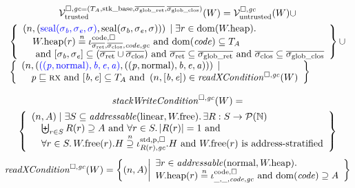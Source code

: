\documentclass[acmsmall,review,anonymous]{acmart}\settopmatter{printfolios=true,printccs=false,printacmref=false}
\renewcommand{\perm}{\var{p}}
\begin{document}
\begin{multline*}
  \lrvtrusted[\square,\gc=(\ta,\stkb,\gsigrets,\gsigcloss)](W) = \lrv(W)\cup \\
  \begin{array}[t]{l}
    \left\{ \begin{array}{l} \npair{\left(\src{\seal{\sigma_\baddr,\sigma_\eaddr,\sigma}}, \seal{\sigma_\baddr,\sigma_\eaddr,\sigma} \right)} 
    \; | \; \exists r \in \dom(\pwheap) \ldotp \\
              \quad \pwheap(r) \nequal \codereg{\sigrets,\sigcloss,\code,\gc} \tand \dom(\code) \subseteq \ta \\
              \quad \tand [\sigma_\baddr,\sigma_\eaddr] \subseteq (\sigrets\cup\sigcloss) \tand \sigrets \subseteq \gsigrets \tand \sigcloss \subseteq \gsigcloss
    \end{array}
    \right\} \cup \\
    \left\{
    \begin{array}{l}
      \npair{\left(\src{((\perm,\normal),\baddr,\eaddr,\aaddr)},((\perm,\normal),\baddr,\eaddr,\aaddr) \right)} \; |  \\
      \quad \perm \sqsubseteq \rx \tand 
       [\baddr,\eaddr] \subseteq \ta \tand 
       \npair{[\baddr,\eaddr]} \in \xReadCond[\square,\gc]{W} 
    \end{array}
    \right\}
  \end{array}
\end{multline*}



\begin{multline*}
  \stackWriteCond{W} =\\
  \left\{
    \begin{array}{l}\npair{A} \mid 
      \exists S \subseteq \addressable{\linear, \pwfree} \ldotp  \exists R : S \fun \powerset{\nats} \\
      \quad \biguplus_{r\in S} R(r) \supseteq A \tand \forall r \in S \ldotp |R(r)| = 1  \tand \\
      \quad \forall r \in S \ldotp \pwfree(r).H \nsupeq \stdreg{R(r),\gc}{\pur}.H \tand \pwfree(r) \text{ is address-stratified}
    \end{array}
  \right\}
\end{multline*}
\[
  \xReadCond{W} = \left\{ \npair{A} \middle|
    \begin{array}{l}
      \exists r \in \addressable{\normal, \pwheap} \ldotp \\
       \pwheap(r) \nequal \codereg{\_,\_,\code,\gc}\tand
       \dom(\code) \supseteq A 
    \end{array}
  \right\}
\]
\end{document}
